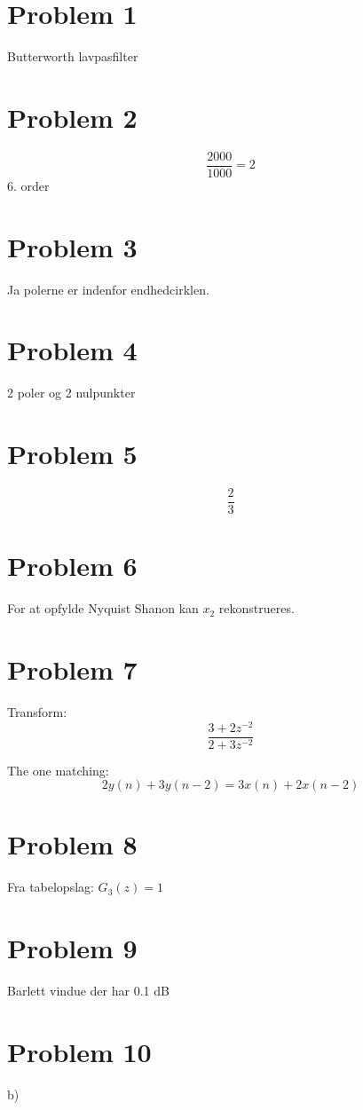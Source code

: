 \section*{Problem 1}
Butterworth lavpasfilter
\section*{Problem 2}
$$\frac{2000}{1000}=2$$
6. order
\section*{Problem 3}
Ja polerne er indenfor endhedcirklen.
\section*{Problem 4}
2 poler og 2 nulpunkter
\section*{Problem 5}
$$\frac{2}{3}$$
\section*{Problem 6}
For at opfylde Nyquist Shanon kan $x_2$ rekonstrueres.
\section*{Problem 7}
Transform:
$$\frac{3+2z^{-2}}{2+3z^{-2}}$$

The one matching:
$$2y(n)+3y(n-2)=3x(n)+2x(n-2)$$
\section*{Problem 8}
Fra tabelopslag: $G_3(z)=1$
\section*{Problem 9}
Barlett vindue der har 0.1 dB
\section*{Problem 10}
b)
